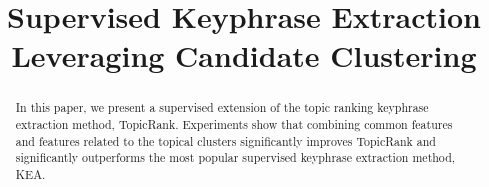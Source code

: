 \documentclass[11pt,letterpaper]{article}
\title{Supervised Keyphrase Extraction Leveraging Candidate Clustering}
\date{}
\begin{document}
  \maketitle

  \begin{abstract}
    In this paper, we present a supervised extension of the topic ranking
    keyphrase extraction method, TopicRank. Experiments show that combining
    common features and features related to the topical clusters significantly
    improves TopicRank and significantly outperforms the most popular supervised
    keyphrase extraction method, KEA.
  \end{abstract}

  
  
  
  
  


  
  
\end{document}
